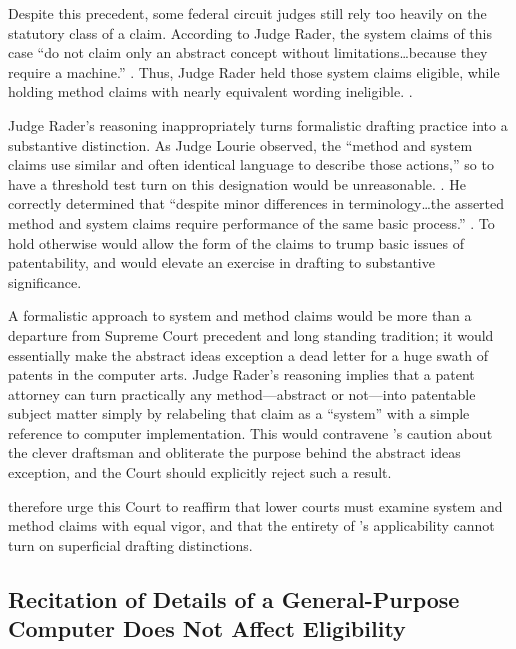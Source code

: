 \documentclass{scotus}
\begin{document}
Despite this precedent, some federal circuit judges still rely too heavily on
the statutory class of a claim.  According to Judge Rader,
the system claims of this case “do not claim only an abstract concept without
limitations\ldots because they require a machine.” . Thus, Judge Rader held those system claims eligible, while holding
method claims with nearly equivalent wording ineligible. .

Judge Rader’s reasoning inappropriately turns formalistic drafting practice into
a substantive distinction.  As Judge Lourie observed, the “method and system
claims use similar and often identical language to describe those actions,” so
to have a threshold test turn on this designation would be unreasonable.
. He correctly determined that “despite minor
differences in terminology\ldots the asserted method and system claims require
performance of the same basic process.” .  To hold
otherwise would allow the form of the claims to trump basic issues of
patentability, and would elevate an exercise in drafting to substantive
significance.

A formalistic approach to system and method claims would be more than a
departure from Supreme Court precedent and long standing tradition; it would
essentially make the abstract ideas exception a dead letter for a huge swath of
patents in the computer arts. Judge Rader’s reasoning implies that a patent
attorney can turn practically any method---abstract or not---into patentable
subject matter simply by relabeling that claim as a “system” with a simple
reference to computer implementation.  This would contravene ’s
caution about the clever draftsman and obliterate the purpose behind the
abstract ideas exception, and the Court should explicitly reject such a result.

\Amici therefore urge this Court to reaffirm that lower courts must examine
system and method claims with equal vigor, and that the entirety of
’s applicability cannot turn on superficial drafting distinctions.  



%
%
\subsection{Recitation of Details of a General-Purpose Computer Does Not Affect
Eligibility}
\end{document}
